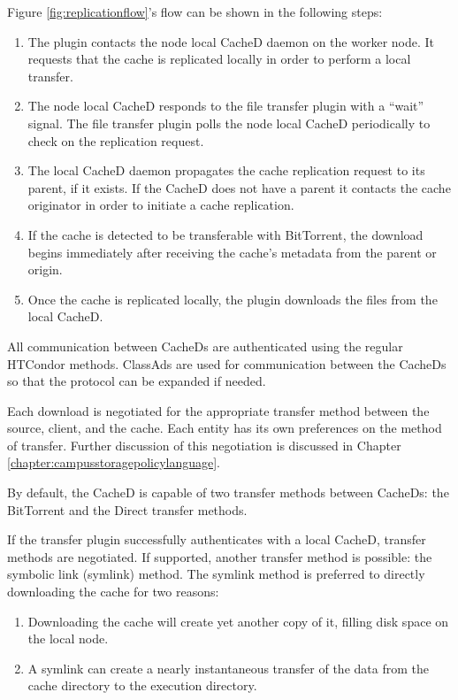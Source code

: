 Figure \ref{fig:replicationflow}'s flow can be shown in the following steps:

\begin{enumerate}
\item The plugin contacts the node local CacheD daemon on the worker node.  It requests that the cache is replicated locally in order to perform a local transfer.
\item The node local CacheD responds to the file transfer plugin with a ``wait'' signal.  The file transfer plugin polls the node local CacheD periodically to check on the replication request.
\item The local CacheD daemon propagates the cache replication request to its parent, if it exists.  If the CacheD does not have a parent it contacts the cache originator in order to initiate a cache replication.
\item If the cache is detected to be transferable with BitTorrent, the download begins immediately after receiving the cache's metadata from the parent or origin.
\item Once the cache is replicated locally, the plugin downloads the files from the local CacheD.
\end{enumerate}

All communication between CacheDs are authenticated using the regular HTCondor methods.  ClassAds are used for communication between the CacheDs so that the protocol can be expanded if needed. 

Each download is negotiated for the appropriate transfer method between the source, client, and the cache.  Each entity has its own preferences on the method of transfer.   Further discussion of this negotiation is discussed in Chapter \ref{chapter:campusstoragepolicylanguage}.

By default, the CacheD is capable of two transfer methods between CacheDs: the BitTorrent and the Direct transfer methods.  

If the transfer plugin successfully authenticates with a local CacheD, transfer methods are negotiated.  If supported, another transfer method is possible: the symbolic link (symlink) method.  The symlink method is preferred to directly downloading the cache for two reasons:
\begin{enumerate}
	\item Downloading the cache will create yet another copy of it, filling disk space on the local node.
	\item A symlink can create a nearly instantaneous transfer of the data from the cache directory to the execution directory.
\end{enumerate}

